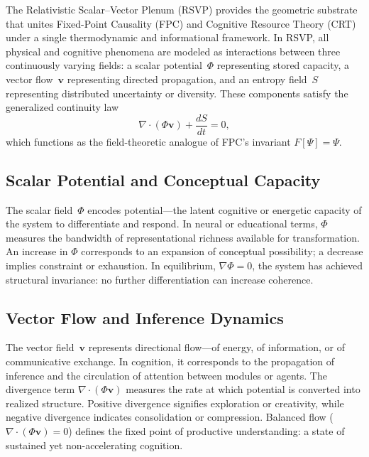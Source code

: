 \documentclass[12pt,a4paper]{article}
\begin{document}
The Relativistic Scalar–Vector Plenum (RSVP) provides the geometric substrate that unites Fixed-Point Causality (FPC) and Cognitive Resource Theory (CRT) under a single thermodynamic and informational framework.
In RSVP, all physical and cognitive phenomena are modeled as interactions between three continuously varying fields:
a scalar potential~$\Phi$ representing stored capacity,
a vector flow~$\mathbf{v}$ representing directed propagation,
and an entropy field~$S$ representing distributed uncertainty or diversity.
These components satisfy the generalized continuity law
\begin{equation}
\nabla\!\cdot(\Phi\mathbf{v})+\frac{dS}{dt}=0,
\label{eq:rsvp-law}
\end{equation}
which functions as the field-theoretic analogue of FPC’s invariant $F[\Psi]=\Psi$.

\subsection{Scalar Potential and Conceptual Capacity}

The scalar field~$\Phi$ encodes potential—the latent cognitive or energetic capacity of the system to differentiate and respond.
In neural or educational terms, $\Phi$ measures the bandwidth of representational richness available for transformation.
An increase in $\Phi$ corresponds to an expansion of conceptual possibility; a decrease implies constraint or exhaustion.
In equilibrium, $\nabla\Phi=0$, the system has achieved structural invariance: no further differentiation can increase coherence.

\subsection{Vector Flow and Inference Dynamics}

The vector field~$\mathbf{v}$ represents directional flow—of energy, of information, or of communicative exchange.
In cognition, it corresponds to the propagation of inference and the circulation of attention between modules or agents.
The divergence term $\nabla\!\cdot(\Phi\mathbf{v})$ measures the rate at which potential is converted into realized structure.
Positive divergence signifies exploration or creativity, while negative divergence indicates consolidation or compression.
Balanced flow ($\nabla\!\cdot(\Phi\mathbf{v})=0$) defines the fixed point of productive understanding: a state of sustained yet non-accelerating cognition.
\end{document}
